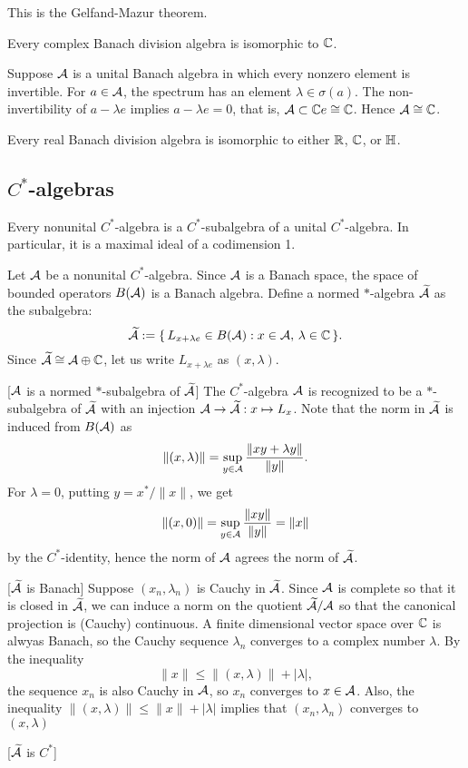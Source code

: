 \documentclass{../crs}
\begin{document}
This is the Gelfand-Mazur theorem.
\begin{thm}
Every complex Banach division algebra is isomorphic to $\mathbb{C}$.
\end{thm}
\begin{pf}
Suppose $\mathcal{A}$ is a unital Banach algebra in which every nonzero element is invertible.
For $a\in\mathcal{A}$, the spectrum has an element $\lambda\in\sigma(a)$.
The non-invertibility of $a-\lambda e$ implies $a-\lambda e=0$, that is, $\mathcal{A}\subset\mathbb{C} e\cong\mathbb{C}$.
Hence $\mathcal{A}\cong\mathbb{C}$.
\end{pf}
\begin{thm}
Every real Banach division algebra is isomorphic to either $\mathbb{R}$, $\mathbb{C}$, or $\mathbb{H}$.
\end{thm}





\subsection{$C^*$-algebras}

\begin{thm}
Every nonunital $C^*$-algebra is a $C^*$-subalgebra of a unital $C^*$-algebra.
In particular, it is a maximal ideal of a codimension 1.
\end{thm}
\begin{pf}
Let $\mathcal{A}$ be a nonunital $C^*$-algebra.
Since $\mathcal{A}$ is a Banach space, the space of bounded operators $B(\mathcal{A})$ is a Banach algebra.
Define a normed $*$-algebra $\widetilde{\mathcal{A}}$ as the subalgebra:
\[\widetilde{\mathcal{A}}:=\{\,L_{x+\lambda e}\in B(\mathcal{A}):x\in\mathcal{A},\,\lambda\in\mathbb{C}\,\}.\]
Since $\widetilde{\mathcal{A}}\cong \mathcal{A}\oplus\mathbb{C}$, let us write $L_{x+\lambda e}$ as $(x,\lambda)$.

[$\mathcal{A}$ is a normed $*$-subalgebra of $\widetilde{\mathcal{A}}$]
The $C^*$-algebra $\mathcal{A}$ is recognized to be a $*$-subalgebra of $\widetilde{\mathcal{A}}$ with an injection $\mathcal{A}\to\widetilde{\mathcal{A}}:x\mapsto L_x$.
Note that the norm in $\widetilde{\mathcal{A}}$ is induced from $B(\mathcal{A})$ as
\[\|(x,\lambda)\|=\sup_{y\in\mathcal{A}}\frac{\|xy+\lambda y\|}{\|y\|}.\]
For $\lambda=0$, putting $y=x^*/\|x\|$, we get
\[\|(x,0)\|=\sup_{y\in\mathcal{A}}\frac{\|xy\|}{\|y\|}=\|x\|\]
by the $C^*$-identity, hence the norm of $\mathcal{A}$ agrees the norm of $\widetilde{\mathcal{A}}$.

[$\widetilde{\mathcal{A}}$ is Banach]
Suppose $(x_n,\lambda_n)$ is Cauchy in $\widetilde{\mathcal{A}}$.
Since $\mathcal{A}$ is complete so that it is closed in $\widetilde{\mathcal{A}}$, we can induce a norm on the quotient $\widetilde{\mathcal{A}}/\mathcal{A}$ so that the canonical projection is (Cauchy) continuous.
A finite dimensional vector space over $\mathbb{C}$ is alwyas Banach, so the Cauchy sequence $\lambda_n$ converges to a complex number $\lambda$.
By the inequality
\[\|x\|\le\|(x,\lambda)\|+|\lambda|,\]
the sequence $x_n$ is also Cauchy in $\mathcal{A}$, so $x_n$ converges to $x\in\mathcal{A}$.
Also, the inequality $\|(x,\lambda)\|\le\|x\|+|\lambda|$ implies that $(x_n,\lambda_n)$ converges to $(x,\lambda)$

[$\widetilde{\mathcal{A}}$ is $C^*$]
\end{pf}
\end{document}
